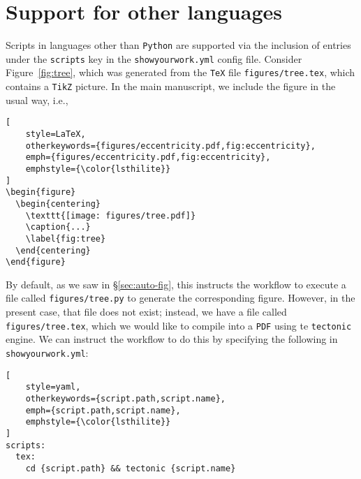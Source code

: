 \documentclass[twocolumn]{aastex631}
\begin{document}
\section{Support for other languages}
\label{sec:other-lang}
%
Scripts in languages other than \texttt{Python} are supported via the inclusion of entries under the \texttt{scripts} key in the \texttt{showyourwork.yml} config file. 
Consider Figure~\ref{fig:tree}, which was generated from the \texttt{TeX} file \texttt{figures/tree.tex}, which contains a \texttt{TikZ} picture. 
In the main manuscript, we include the figure in the usual way, i.e.,\\

\noindent\begin{minipage}{\linewidth}
\begin{lstlisting}[
    style=LaTeX,
    otherkeywords={figures/eccentricity.pdf,fig:eccentricity},
    emph={figures/eccentricity.pdf,fig:eccentricity},
    emphstyle={\color{lsthilite}}
]
\begin{figure}
  \begin{centering}
    \texttt{[image: figures/tree.pdf]}
    \caption{...}
    \label{fig:tree}
  \end{centering}
\end{figure}
\end{lstlisting}
\end{minipage}

\noindent By default, as we saw in \S\ref{sec:auto-fig}, this instructs the workflow to execute a file called \texttt{figures/tree.py} to generate the corresponding figure. 
However, in the present case, that file does not exist; instead, we have a file called \texttt{figures/tree.tex}, which we would like to compile into a \texttt{PDF} using te \texttt{tectonic} engine.
We can instruct the workflow to do this by specifying the following in \texttt{showyourwork.yml}:\\

\noindent\begin{minipage}{\linewidth}
\begin{lstlisting}[
    style=yaml,
    otherkeywords={script.path,script.name},
    emph={script.path,script.name},
    emphstyle={\color{lsthilite}}
]
scripts:
  tex:
    cd {script.path} && tectonic {script.name}
\end{lstlisting}
\end{minipage}
\end{document}
